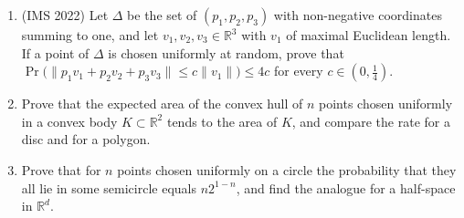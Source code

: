\documentclass[11pt,a4paper]{article}
\renewcommand{\le}{\leqslant}
\begin{document}
\begin{enumerate}
\item (IMS 2022) Let $\Delta$ be the set of $(p_1,p_2,p_3)$ with non-negative coordinates summing to
one, and let $v_1,v_2,v_3\in\mathbb R^3$ with $v_1$ of maximal Euclidean length. If a point of
$\Delta$ is chosen uniformly at random, prove that
$\Pr\bigl(\|p_1v_1+p_2v_2+p_3v_3\|\le c\|v_1\|\bigr)\le4c$ for every $c\in(0,\frac14)$.

\item Prove that the expected area of the convex hull of $n$ points chosen uniformly in a convex body
$K\subset\mathbb R^2$ tends to the area of $K$, and compare the rate for a disc and for a polygon.

\item Prove that for $n$ points chosen uniformly on a circle the probability that they all lie in
some semicircle equals $n2^{1-n}$, and find the analogue for a half-space in $\mathbb R^d$.
\end{enumerate}
\end{document}
